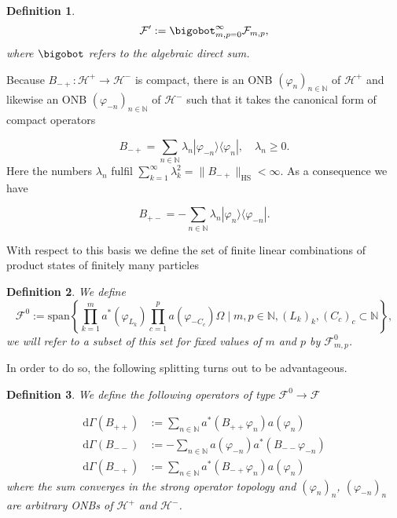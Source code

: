 \documentclass[b5paper,draft,openbib,12pt]{memoir}
\newtheorem{Def}{Definition}
\begin{document}
\begin{Def}
\begin{equation}
\mathcal{F}':=\bigobot_{m,p=0}^\infty \mathcal{F}_{m,p},
\end{equation}
where \(\bigobot\) refers to the algebraic direct sum.
\end{Def}
Because \(B_{-+}:\mathcal{H}^+\rightarrow \mathcal{H}^-\) is compact, there is an ONB \((\varphi_n)_{n\in\mathbb{N}}\) 
of \(\mathcal{H}^+\) and likewise an ONB \((\varphi_{-n})_{n\in\mathbb{N}}\) of \(\mathcal{H}^-\) such that it takes the canonical form 
of compact operators

\begin{equation}
B_{-+} = \sum_{n\in\mathbb{N}} \lambda_n |\varphi_{-n}\rangle \langle \varphi_{n}|, \quad \lambda_n \ge 0.
\end{equation}
Here the numbers \(\lambda_n\) fulfil \(\sum_{k=1}^\infty \lambda_k^2 = \|B_{-+}\|_{\text{HS}}<\infty\). As a consequence we have

\begin{equation}
B_{+-} = -\sum_{n\in\mathbb{N}} \lambda_n |\varphi_{n}\rangle \langle \varphi_{-n}|.
\end{equation}

With respect to this basis we define the set of finite linear combinations of product states of finitely many particles

\begin{Def}
We define
\begin{equation}
\mathcal{F}^0\!\!:=\! \mathrm{span}\!\! \left\{\prod_{k=1}^m \!a^*\!(\varphi_{L_k}\!)\!\prod_{c=1}^p\!\! a(\varphi_{-C_c})\Omega\mid m,p\!\in\!\!\mathbb{N}, (L_k)_k,\!(C_c)_c\!\subset\!\mathbb{N} \!\right\}\!,
\end{equation}
we will refer to a subset of this set for fixed values of \(m\) and \(p\) by \(\mathcal{F}^0_{m,p}\).
\end{Def}

In order to do so, the following splitting turns out to be advantageous. 

\begin{Def}
We define the following operators of type \(\mathcal{F}^0\rightarrow \mathcal{F}\)

\begin{align}\label{predefdGamma}
\mathrm{d}\Gamma(B_{++})&:= \sum_{n\in\mathbb{N}}  a^*(B_{++} \varphi_n) a(\varphi_n) \\
\mathrm{d}\Gamma(B_{--})&:= -\sum_{n\in\mathbb{N}}   a(\varphi_{-n})a^*(B_{--} \varphi_{-n}) \\
\mathrm{d}\Gamma(B_{-+})&:= \sum_{n\in\mathbb{N}}  a^*(B_{-+}\varphi_{n}) a(\varphi_n)
\end{align}
where the sum converges in the strong operator topology and 
\((\varphi_n)_n \), \((\varphi_{-n})_n\) are arbitrary 
ONBs of \(\mathcal{H}^+\) and \(\mathcal{H}^-\).
\end{Def}
\end{document}
